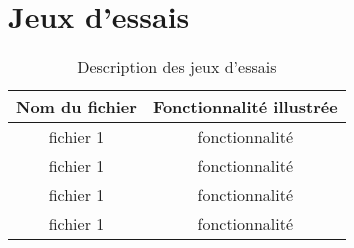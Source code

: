 \documentclass{report}
\begin{document}
	\section{Jeux d'essais}
	\begin{table}[!h]
		\begin{center}
		\begin{tabular}{|c|c|}
			\hline
			\textbf{Nom du fichier} & \textbf{Fonctionnalité illustrée}\\
			\hline
			fichier 1 & fonctionnalité\\
			\hline
			fichier 1 & fonctionnalité\\
			\hline
			fichier 1 & fonctionnalité\\
			\hline
			fichier 1 & fonctionnalité\\
			\hline
		\end{tabular}
		\end{center}
		\caption{Description des jeux d'essais}
	\end{table}
\end{document}
